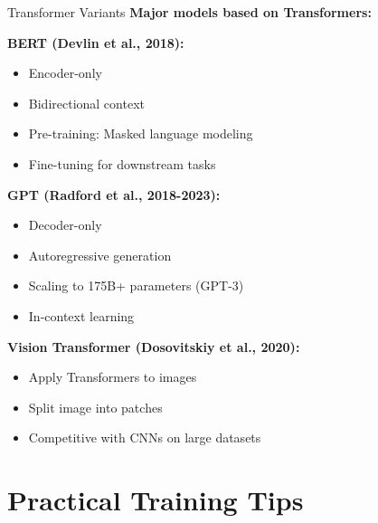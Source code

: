 \documentclass[aspectratio=169]{beamer}
\begin{document}
\begin{frame}{Transformer Variants}
  \textbf{Major models based on Transformers:}

  \vspace{0.5em}

  \textbf{BERT (Devlin et al., 2018):}
  \begin{itemize}
    \item Encoder-only
    \item Bidirectional context
    \item Pre-training: Masked language modeling
    \item Fine-tuning for downstream tasks
  \end{itemize}

  \textbf{GPT (Radford et al., 2018-2023):}
  \begin{itemize}
    \item Decoder-only
    \item Autoregressive generation
    \item Scaling to 175B+ parameters (GPT-3)
    \item In-context learning
  \end{itemize}

  \textbf{Vision Transformer (Dosovitskiy et al., 2020):}
  \begin{itemize}
    \item Apply Transformers to images
    \item Split image into patches
    \item Competitive with CNNs on large datasets
  \end{itemize}
\end{frame}

\section{Practical Training Tips}
\end{document}
